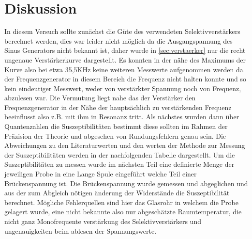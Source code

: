 \section{Diskussion} %
\label{sec:Diskussion}
In diesem Versuch sollte zunächst die Güte des verwendeten Selektivverstärkers berechnet werden,
dies war leider nicht möglich da die Ausgangspannung des Sinus Generators nicht bekannt ist, daher
wurde in \autoref{sec:verstaerker} nur die recht ungenaue Verstärkerkurve dargestellt. Es konnten
in der nähe des Maximums der Kurve also bei etwa 35,5KHz keine weiteren Messwerte aufgenommen werden
da der Frequenzgenerator in diesem Bereich die Frequenz nicht halten konnte und so kein eindeutiger 
Messwert, weder von verstärkter Spannung noch von Frequenz, abzulesen war. Die Vermutung liegt nahe das
der Verstärker den Frequenzgenerator in der Nähe der hauptsächlich zu verstärkenden Frequenz beeinflusst
also z.B. mit ihm in Resonanz tritt. Als nächstes wurden dann über Quantenzahlen die Suszeptibilitäten 
bestimmt diese sollten im Rahmen der Präzision der Theorie und abgesehen von Rundungsfehlern genau sein. Die
Abweichungen zu den Literaturwerten und den werten der Methode zur Messung der Suszeptibilitäten werden in der
nachfolgenden Tabelle dargestellt. Um die Suszeptibilitäten zu messen wurde im nächsten Teil eine definierte Menge 
der jeweiligen Probe in eine Lange Spule eingeführt welche Teil einer Brückenspannung
ist. Die Brückenspannung wurde gemessen und abgeglichen und aus der zum Abgleich nötigen änderung der Widerstände
die Suszeptibilität berechnet. Mögliche Fehlerquellen sind hier das Glasrohr in welchem die Probe gelagert wurde,
eine nicht bekannte also nur abgeschätzte Raumtemperatur, die nicht ganz Monofrequente verstärkung des Selektivverstärkers
und ungenauigkeiten beim ablesen der Spannungswerte.


